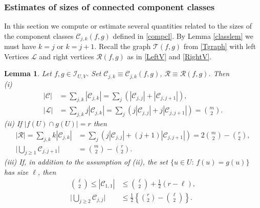 \documentclass[reqno]{amsart}
\theoremstyle{theorem}
\newtheorem{lemma}[theorem]{Lemma}
\theoremstyle{definition}
\theoremstyle{remark}
\def\LL{\mathscr{L}}
\def\RR{\mathscr{R}}
\def\TT{\mathscr{T}}
\def\CC{\mathscr{C}}
\newcommand{\1}{{\text{\Large $\mathfrak 1$}}}	%
\numberwithin{equation}{section}
\def\II{\mathscr I}
\begin{document}
\subsubsection{\bfseries Estimates of sizes of connected component classes}
\label{SiSi}
In this section we compute or estimate several quantities related to
the sizes of the component classes $\CC_{j,k}(f,g)$ defined in \eqref{compcl}.
By Lemma \ref{classlem} we must have $k=j$ or $k=j+1$.
Recall the graph $\TT(f,g)$ from \eqref{Tgraph} with left Vertices $\LL$
and right vertices $\RR(f,g)$ as in \eqref{LeftV} and  \eqref{RightV}.
\begin{lemma}
\label{escc}
Let $f, g \in  \II_{U,V}$. Set $\CC_{j,k}\equiv \CC_{j,k}(f,g)$, 
$\RR \equiv \RR(f,g)$. Then
\\
(i)
\begin{align}
|\CC| &= \sum_{j,k} |\CC_{j,k}| =  \sum_j (|\CC_{j,j}| + |\CC_{j,j+1}|),
\label{X1}
\\
|\LL| &= \sum_{j,k} j |\CC_{j,k}|
= \sum_j  (j |\CC_{j,j}| + j |\CC_{j,j+1}|) = \binom{m}{2}.
\label{X2}
\end{align}
(ii) If $|f(U)\cap g(U)|=r$ then
\begin{align}
 |\RR| = \sum_{j,k} k |\CC_{j,k}|
&= \sum_j  (j |\CC_{j,j}| + (j+1) |\CC_{j,j+1}|) 
= 2 \binom{m}{2} - \binom{r}{2},
\label{X3}
\\
\bigg| \bigcup_{j \ge 1} \CC_{j,j+1}\bigg| &= \binom{m}{2}-\binom{r}{2}.
\label{X4}
\end{align}
(iii) If, in addition to the assumption of (ii), 
the set $\{u \in U:\, f(u)=g(u)\}$ has size $\ell$, then
\begin{align}
\binom{\ell}{2} \le \left| \CC_{1,1} \right| 
&\le \binom{\ell}{2}+ \frac{1}{2}(r-\ell),
\label{X5}
\\
\bigg| \bigcup_{j \ge 2} \CC_{j,j}\bigg|  
& \le \frac12\left\{ \binom{r}{2} - \binom{\ell}{2} \right\}.
\label{X6}
\end{align}
\end{lemma}
\end{document}
